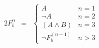 \documentclass[10pt,a4paper,oneside,ngerman,numbers=noenddot]{scrartcl}
\begin{document}
\subsection{} %
\begin{alignat*}{2}
F^{n}_{b} &=& \begin{cases}
A & n=1 \\
\neg A & n=2 \\
(A \wedge B) & n=3 \\
\neg F^{(n-1)}_{b} & n > 3
\end{cases}
\end{alignat*}
\end{document}
